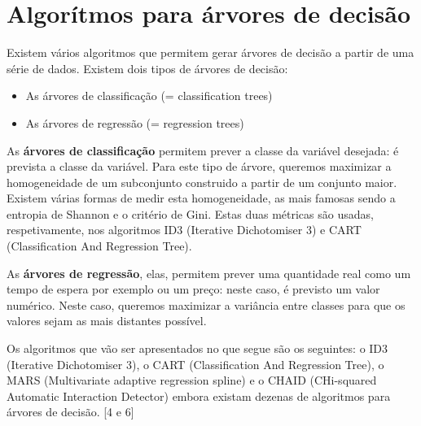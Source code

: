 \documentclass{article}
\begin{document}
\section{Algorítmos para árvores de decisão}
\hspace{10mm}Existem vários algoritmos que permitem gerar árvores de decisão a partir de uma série de dados. Existem dois tipos de árvores de decisão:
\begin{itemize}
  \item[\textbullet]{As árvores de classificação (= classification trees)}
  \item[\textbullet]{As árvores de regressão (= regression trees) }
\end{itemize}
\hspace{10mm}As \textbf{árvores de classificação} permitem prever a classe da variável desejada: é prevista a classe da variável. Para este tipo de árvore, queremos maximizar a homogeneidade de um subconjunto construido a partir de um conjunto maior. Existem várias formas de medir esta homogeneidade, as mais famosas sendo a entropia de Shannon e o critério de Gini. Estas duas métricas são usadas, respetivamente, nos algoritmos ID3 (Iterative Dichotomiser 3) e CART (Classification And Regression Tree).\par
As \textbf{árvores de regressão}, elas, permitem prever uma quantidade real como um tempo de espera por exemplo ou um preço: neste caso, é previsto um valor numérico. Neste caso, queremos maximizar a variância entre classes para que os valores sejam as mais distantes possível.\par
Os algoritmos que vão ser apresentados no que segue são os seguintes: o ID3 (Iterative Dichotomiser 3), o CART (Classification And Regression Tree), o MARS (Multivariate adaptive regression spline) e o CHAID (CHi-squared Automatic Interaction Detector) embora existam dezenas de algoritmos para árvores de decisão.  [4 e 6]
\end{document}
